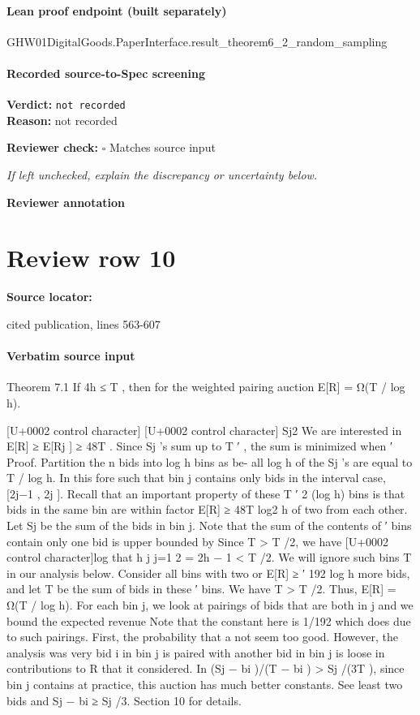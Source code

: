 \documentclass[10pt]{article}
\newcommand{\reviewerbox}{%
  \par\noindent\fbox{\parbox{0.96\linewidth}{\rule{0pt}{0.38in}}}\par
}
\newcommand{\reviewmatch}[1]{%
  \par\noindent\textbf{Reviewer check:} $\square$\; #1\par
  \noindent\emph{If left unchecked, explain the discrepancy or uncertainty below.}\par
}
\begin{document}
\paragraph{Lean proof endpoint (built separately)}\begin{ReviewVerbatim}
GHW01DigitalGoods.PaperInterface.result_theorem6_2_random_sampling
\end{ReviewVerbatim}

\paragraph{Recorded source-to-Spec screening}
\textbf{Verdict:} \texttt{not recorded}
\\
\textbf{Reason:} not recorded
\reviewmatch{Matches source input}
\noindent\textbf{Reviewer annotation}\par
\reviewerbox
\clearpage
\hypertarget{source-claim-f07b3322ac4a8773}{}
\section*{Review row 10}
\textbf{Source locator:} {\footnotesize\raggedright cited publication, lines 563-\allowbreak{}607\par}
\paragraph{Verbatim source input}
\begin{ReviewVerbatim}
Theorem 7.1 If 4h ≤ T , then for the weighted pairing auction E[R] = Ω(T / log h).

[U+0002 control character]
[U+0002 control character] Sj2
We are interested in E[R] ≥
E[Rj ] ≥
48T .
Since Sj ’s sum up to T ′ , the sum is minimized when
′
Proof. Partition the n bids into log h bins as be- all log h of the Sj ’s are equal to T / log h. In this
fore such that bin j contains only bids in the interval case,
[2j−1 , 2j ]. Recall that an important property of these
T ′ 2 (log h)
bins is that bids in the same bin are within factor
E[R] ≥
48T log2 h
of two from each other. Let Sj be the sum of the
bids in bin j. Note that the sum of the contents of
′
bins
contain only one bid is upper bounded by Since T > T /2, we have
[U+0002 control character]log that
h j
j=1 2 = 2h − 1 < T /2. We will ignore such bins
T
in our analysis below. Consider all bins with two or
E[R] ≥
′
192
log h
more bids, and let T be the sum of bids in these
′
bins. We have T > T /2.
Thus, E[R] = Ω(T / log h).
For each bin j, we look at pairings of bids that
are both in j and we bound the expected revenue
Note that the constant here is 1/192 which does
due to such pairings. First, the probability that a
not seem too good. However, the analysis was very
bid i in bin j is paired with another bid in bin j is
loose in contributions to R that it considered. In
(Sj − bi )/(T − bi ) > Sj /(3T ), since bin j contains at
practice, this auction has much better constants. See
least two bids and Sj − bi ≥ Sj /3.
Section 10 for details.
\end{ReviewVerbatim}
\end{document}
